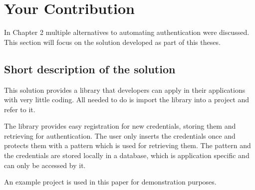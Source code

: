 
\chapter{Your Contribution} %

In Chapter 2 multiple alternatives to automating authentication were discussed. This section will focus on the solution developed as part of this theses. 



\ifpdf
    \graphicspath{{X/figures/PNG/}{X/figures/PDF/}{X/figures/}}
\else
    \graphicspath{{X/figures/EPS/}{X/figures/}}
\fi


\section{Short description of the solution}
This solution provides a library that developers can apply in their applications with very little coding. All needed to do is import the library into a project and refer to it.

The library provides easy registration for new credentials, storing them and retrieving for authentication. The user only inserts the credentials once and protects them with a pattern which is used for retrieving them. The pattern and the credentials are stored locally in a database, which is application specific and can only be accessed by it. 

An example project is used in this paper for demonstration purposes.

\newpage

